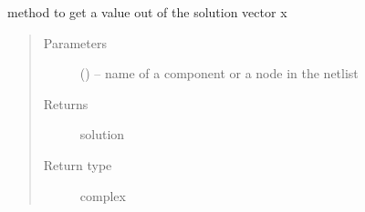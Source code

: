 \documentclass[letterpaper,12pt,english]{sphinxmanual}
\begin{document}
\begin{fulllineitems}

\begin{fulllineitems}
\label{\detokenize{Modeling/CircuitSystemEquations:Modeling.CircuitSystemEquations.CircuitSystemEquations.getCompByName}}
\end{fulllineitems}


\begin{fulllineitems}
\label{\detokenize{Modeling/CircuitSystemEquations:Modeling.CircuitSystemEquations.CircuitSystemEquations.getPreviousSolutionAt}}
\end{fulllineitems}


\begin{fulllineitems}
\label{\detokenize{Modeling/CircuitSystemEquations:Modeling.CircuitSystemEquations.CircuitSystemEquations.getSolutionAt}}
method to get a value out of the solution vector x
\begin{quote}\begin{description}
\item[{Parameters}] \leavevmode
{} () -- name of a component or a node in the netlist

\item[{Returns}] \leavevmode
solution

\item[{Return type}] \leavevmode
complex

\end{description}\end{quote}

\end{fulllineitems}


\begin{fulllineitems}
\label{\detokenize{Modeling/CircuitSystemEquations:Modeling.CircuitSystemEquations.CircuitSystemEquations.isVoltage}}
\end{fulllineitems}


\end{fulllineitems}
\end{document}
